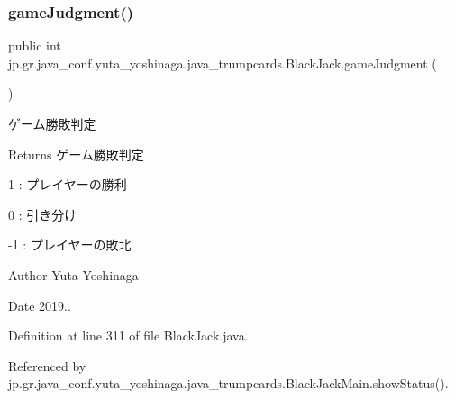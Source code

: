 \subsubsection{\texorpdfstring{game\+Judgment()}{gameJudgment()}}
{\footnotesize\ttfamily public int jp.\+gr.\+java\+\_\+conf.\+yuta\+\_\+yoshinaga.\+java\+\_\+trumpcards.\+Black\+Jack.\+game\+Judgment (\begin{DoxyParamCaption}{ }\end{DoxyParamCaption})}



ゲーム勝敗判定 

\begin{DoxyReturn}{Returns}
ゲーム勝敗判定
\begin{DoxyItemize}
\item 1 \+: プレイヤーの勝利
\item 0 \+: 引き分け
\item -\/1 \+: プレイヤーの敗北
\end{DoxyItemize}
\end{DoxyReturn}
\begin{DoxyAuthor}{Author}
Yuta Yoshinaga 
\end{DoxyAuthor}
\begin{DoxyDate}{Date}
2019.. 
\end{DoxyDate}


Definition at line 311 of file Black\+Jack.\+java.



Referenced by jp.\+gr.\+java\+\_\+conf.\+yuta\+\_\+yoshinaga.\+java\+\_\+trumpcards.\+Black\+Jack\+Main.\+show\+Status().

